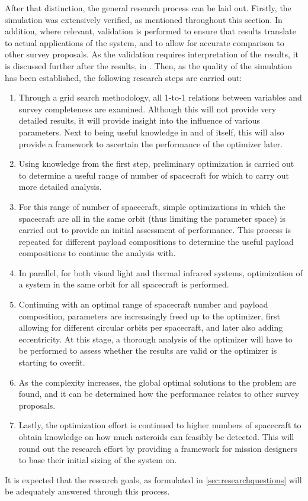 After that distinction, the general research process can be laid out. Firstly, the simulation was extensively verified, as mentioned throughout this section. In addition, where relevant, validation is performed to ensure that results translate to actual applications of the system, and to allow for accurate comparison to other survey proposals. As the validation requires interpretation of the results, it is discussed further after the results, in \label{ch:validation}. Then, as the quality of the simulation has been established, the following research steps are carried out:
\begin{enumerate}
 \item Through a grid search methodology, all 1-to-1 relations between variables and survey completeness are examined. Although this will not provide very detailed results, it will provide insight into the influence of various parameters. Next to being useful knowledge in and of itself, this will also provide a framework to ascertain the performance of the optimizer later.
 \item Using knowledge from the first step, preliminary optimization is carried out to determine a useful range of number of spacecraft for which to carry out more detailed analysis.
 \item For this range of number of spacecraft, simple optimizations in which the spacecraft are all in the same orbit (thus limiting the parameter space) is carried out to provide an initial assessment of performance. This process is repeated for different payload compositions to determine the useful payload compositions to continue the analysis with.
 \item In parallel, for both visual light and thermal infrared systems, optimization of a system in the same orbit for all spacecraft is performed.
 \item Continuing with an optimal range of spacecraft number and payload composition, parameters are increasingly freed up to the optimizer, first allowing for different circular orbits per spacecraft, and later also adding eccentricity. At this stage, a thorough analysis of the optimizer will have to be performed to assess whether the results are valid or the optimizer is starting to overfit.
 \item As the complexity increases, the global optimal solutions to the problem are found, and it can be determined how the performance relates to other survey proposals.
 \item Lastly, the optimization effort is continued to higher numbers of spacecraft to obtain knowledge on how much asteroids can feasibly be detected. This will round out the research effort by providing a framework for mission designers to base their initial sizing of the system on.
\end{enumerate}
It is expected that the research goals, as formulated in \autoref{sec:researchquestions} will be adequately answered through this process.
